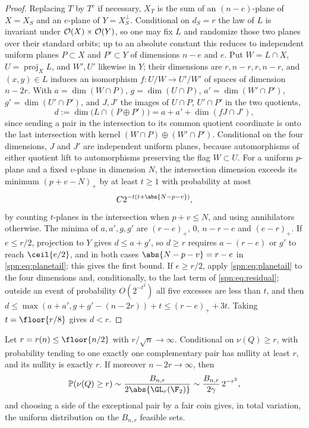 \begin{proof}
Replacing $T$ by $T^c$ if necessary, $X_T$ is the sum of an $(n-e)$-plane of $X=X_S$ and an
$e$-plane of $Y=X_S^\perp$. Conditional on $d_S=r$ the law of $L$ is invariant under
$\mathcal{O}(X)\times\mathcal{O}(Y)$, so one may fix $L$ and randomize those two planes over their
standard orbits; up to an absolute constant this reduces to independent uniform planes
$P\subset X$ and $P'\subset Y$ of dimensions $n-e$ and $e$. Put $W=L\cap X$, $U=\operatorname{proj}_XL$,
and $W',U'$ likewise in $Y$; their dimensions are $r,n-r,r,n-r$, and $(x,y)\in L$ induces an
isomorphism $f\colon U/W\to U'/W'$ of spaces of dimension $n-2r$. With
$a=\dim(W\cap P)$, $g=\dim(U\cap P)$, $a'=\dim(W'\cap P')$, $g'=\dim(U'\cap P')$, and $J,J'$ the
images of $U\cap P$, $U'\cap P'$ in the two quotients,
\begin{equation}\label{spn:eq:residual}
 d:=\dim\bigl(L\cap(P\oplus P')\bigr)=a+a'+\dim(fJ\cap J'),
\end{equation}
since sending a pair in the intersection to its common quotient coordinate is onto the last
intersection with kernel $(W\cap P)\oplus(W'\cap P')$. Conditional on the four dimensions, $J$ and
$J'$ are independent uniform planes, because automorphisms of either quotient lift to
automorphisms preserving the flag $W\subset U$. For a uniform $p$-plane and a fixed $v$-plane in
dimension $N$, the intersection dimension exceeds its minimum $(p+v-N)_+$ by at least $t\ge1$
with probability at most
\begin{equation}\label{spn:eq:planetail}
 C2^{-t(t+\abs{N-p-v})},
\end{equation}
by counting $t$-planes in the intersection when $p+v\le N$, and using annihilators otherwise. The
minima of $a,a',g,g'$ are $(r-e)_+$, $0$, $n-r-e$ and $(e-r)_+$. If $e\le r/2$, projection to $Y$
gives $d\le a+g'$, so $d\ge r$ requires $a-(r-e)$ or $g'$ to reach $\ceil{e/2}$, and in both cases
$\abs{N-p-v}=r-e$ in \eqref{spn:eq:planetail}; this gives the first bound. If $e\ge r/2$, apply
\eqref{spn:eq:planetail} to the four dimensions and, conditionally, to the last term of
\eqref{spn:eq:residual}; outside an event of probability $O(2^{-t^2})$ all five excesses are less
than $t$, and then $d\le\max(a+a',g+g'-(n-2r))+t\le(r-e)_++3t$. Taking $t=\floor{r/8}$ gives
$d<r$.
\end{proof}

\begin{theorem}\label{spn:thm:rare}
Let $r=r(n)\le\floor{n/2}$ with $r/\sqrt n\to\infty$. Conditional on $\nu(Q)\ge r$, with
probability tending to one exactly one complementary pair has nullity at least $r$, and its
nullity is exactly $r$. If moreover $n-2r\to\infty$, then
\begin{equation}\label{spn:eq:rare}
 \spnP(\nu(Q)\ge r)\sim\frac{B_{n,r}}{2\abs{\GL_r(\F_2)}}\sim\frac{B_{n,r}}{2\gamma}\,2^{-r^2},
\end{equation}
and choosing a side of the exceptional pair by a fair coin gives, in total variation, the uniform
distribution on the $B_{n,r}$ feasible sets.
\end{theorem}

